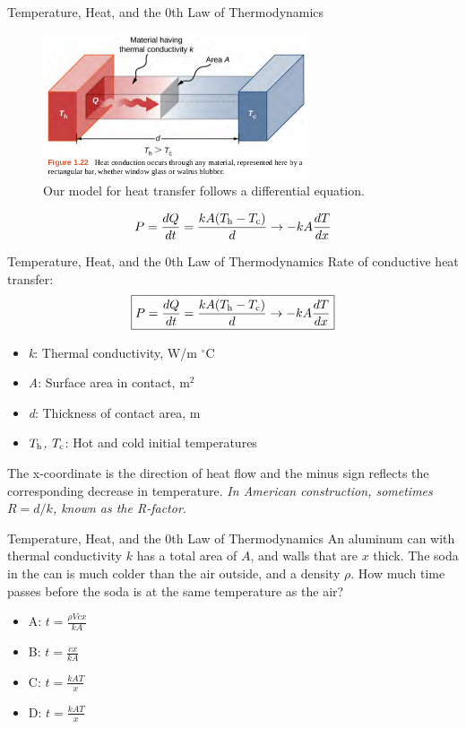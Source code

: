 \documentclass{beamer}
\begin{document}
\begin{frame}{Temperature, Heat, and the 0th Law of Thermodynamics}
\begin{figure}
\centering
\includegraphics[width=0.7\textwidth]{figures/heat1.png}
\caption{\label{fig:heat1} Our model for heat transfer follows a differential equation.}
\end{figure}
\begin{equation}
P = \frac{dQ}{dt} = \frac{kA(T_{\rm h} - T_{\rm c})}{d} \rightarrow -kA \frac{dT}{dx}
\end{equation}
\end{frame}

\begin{frame}{Temperature, Heat, and the 0th Law of Thermodynamics}
\alert{Rate of conductive heat transfer}:
\begin{equation}
\boxed{
P = \frac{dQ}{dt} = \frac{kA(T_{\rm h} - T_{\rm c})}{d} \rightarrow -kA \frac{dT}{dx}}
\end{equation}
\begin{itemize}
\item \textit{k}: Thermal conductivity, W/m $^{\circ}$C
\item \textit{A}: Surface area in contact, m$^2$
\item \textit{d}: Thickness of contact area, m
\item \textit{$T_{\rm h}$, $T_{\rm c}$}: Hot and cold initial temperatures
\end{itemize}
The x-coordinate is the direction of heat flow and the minus sign reflects the corresponding decrease in temperature.  \textit{In American construction, sometimes $R = d/k$, known as the R-factor.}
\end{frame}

\begin{frame}{Temperature, Heat, and the 0th Law of Thermodynamics}
An aluminum can with thermal conductivity $k$ has a total area of $A$, and walls that are $x$ thick.  The soda in the can is much colder than the air outside, and a density $\rho$.  How much time passes before the soda is at the same temperature as the air?
\begin{itemize}
\item A: $t = \frac{\rho Vcx}{kA}$
\item B: $t = \frac{cx}{kA}$
\item C: $t = \frac{kAT}{x}$
\item D: $t = \frac{kAT}{x}$
\end{itemize}
\end{frame}
\end{document}
